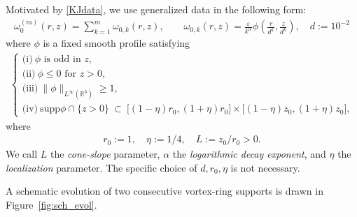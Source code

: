 \documentclass[reqno,11pt]{amsart}
\begin{document}
Motivated by \eqref{KJdata}, we use generalized data in the following form:
    \begin{align}
\label{KJdata2}
    \omega_0^{(m)}(r,z)
    =
    \sum_{k=1}^{m} \omega_{0,k}(r,z),
    \qquad
    \omega_{0,k}(r,z)
    =
    \frac{\varepsilon}{k^\alpha}
    \phi\!\left( \frac{r}{d^k}, \frac{z}{d^k} \right),
    \quad d:=10^{-2}
\end{align}
where $\phi$ is a fixed smooth profile satisfying
\begin{align}
\label{cond_phi}
    \begin{cases}
    \text{(i)}\ \phi \text{ is odd in } z,\\
    \text{(ii)}\ \phi \le 0 \text{ for } z>0,\\
    \text{(iii)}\ \|\phi\|_{L^\infty(\mathbb{R}^3)}\geq 1,\\
    \text{(iv)}\ 
        \mathrm{supp} \phi\cap\{z>0\}\ \subset\
\big[(1-\eta)r_0,(1+\eta)r_0\big]\times \big[(1-\eta)z_0,(1+\eta )z_0\big],
    \end{cases}
\end{align}
where
    \begin{align*}
        r_0:=1, \quad \eta:=1/4, \quad L:=z_0/r_0>0.
    \end{align*}
 We call $L$ the \emph{cone-slope} parameter, $\alpha$ the \emph{logarithmic decay exponent}, and $\eta$ the \emph{localization} parameter. The specific choice of $d, r_0, \eta$ is not necessary. 

A schematic evolution of two consecutive vortex-ring supports is drawn in Figure~\ref{fig:sch_evol}.
\end{document}
